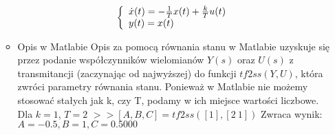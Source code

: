 \documentclass[a4paper,10pt]{article}
\begin{document}
\begin{itemize}
\begin{itemize}
\begin{eqnarray}
		\left\{ \begin{array}{l}
			\dot{x}(t) = -{1 \over T}x(t) + {k \over T}u(t)\\
			y(t) = x(t)
		\end{array} \right.
	\end{eqnarray}
\item Opis w Matlabie
\newline Opis za pomocą równania stanu w Matlabie uzyskuje się przez podanie współczynników wielomianów $Y(s)$ oraz $U(s)$ z transmitancji (zaczynając od najwyższej) do funkcji $tf2ss(Y, U)$, która zwróci parametry równania stanu.
Ponieważ w Matlabie nie możemy stosować stałych jak k, czy T, podamy w ich miejsce wartości liczbowe.
\newline\newline Dla $k=1$, $T=2$
\newline $>>[A,B,C] = tf2ss([1], [2 \ 1])$
\newline Zwraca wynik:
$A = -0.5, B = 1, C = 0.5000$

\end{itemize}


\end{itemize}
\end{document}
